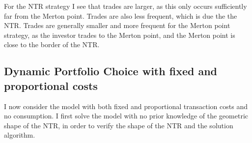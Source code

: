 \documentclass[11pt]{article}
\begin{document}
For the NTR strategy I see that trades are larger, as this only occurs sufficiently far from the Merton point.
Trades are also less frequent, which is due the the \ac{NTR}.
Trades are generally smaller and more frequent for the Merton point strategy, as the investor trades to the Merton point, and the Merton point is close to the border of the NTR.
\subsection{Dynamic Portfolio Choice with fixed and proportional costs} \label{Subsection: Fixed_Proportional}
I now consider the model with both fixed and proportional transaction costs and no consumption.
I first solve the model with no prior knowledge of the geometric shape of the \ac{NTR}, in order to verify the shape of the \ac{NTR} and the solution algorithm.
\end{document}
